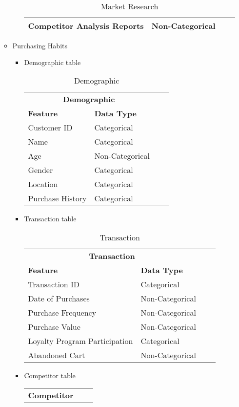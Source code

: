 \documentclass[12pt,a4Paper]{article}
\begin{document}
\begin{enumerate}
\begin{itemize}
\begin{itemize}
\begin{table}
\begin{tabular}{llll}
		Competitor Analysis Reports & Non-Categorical\\\hline
		\end{tabular}
		\centering
		\caption{Market Research}
		\end{table}
		\end{itemize}
	\item Purchasing Habits
		\begin{itemize}
		\item Demographic table
		\begin{table}
		\begin{tabular}{llll}\hline
		\multicolumn{2}{c}{\textbf{Demographic}} & &\\
		\textbf{Feature} & \textbf{Data Type}\\\hline
		Customer ID & Categorical\\
		Name & Categorical\\
		Age & Non-Categorical\\
		Gender & Categorical\\
		Location & Categorical\\
		Purchase History & Categorical\\\hline
		\end{tabular}
		\centering
		\caption{Demographic}
		\end{table}	
		\item Transaction table
		\begin{table}
		\begin{tabular}{llll}\hline
		\multicolumn{2}{c}{\textbf{Transaction}} & &\\
		\textbf{Feature} & \textbf{Data Type}\\\hline
		Transaction ID & Categorical\\
		Date of Purchases & Non-Categorical\\
		Purchase Frequency & Non-Categorical\\
		Purchase Value & Non-Categorical\\
		Loyalty Program Participation & Categorical\\
		Abandoned Cart & Non-Categorical\\\hline
		\end{tabular}
		\centering
		\caption{Transaction}
		\end{table}
		\newpage	
		\item Competitor table
		\begin{table}
		\begin{tabular}{llll}\hline
		\multicolumn{2}{c}{\textbf{Competitor}} & &\\

\end{tabular}
\end{table}
\end{itemize}
\end{itemize}
\end{enumerate}
\end{document}
